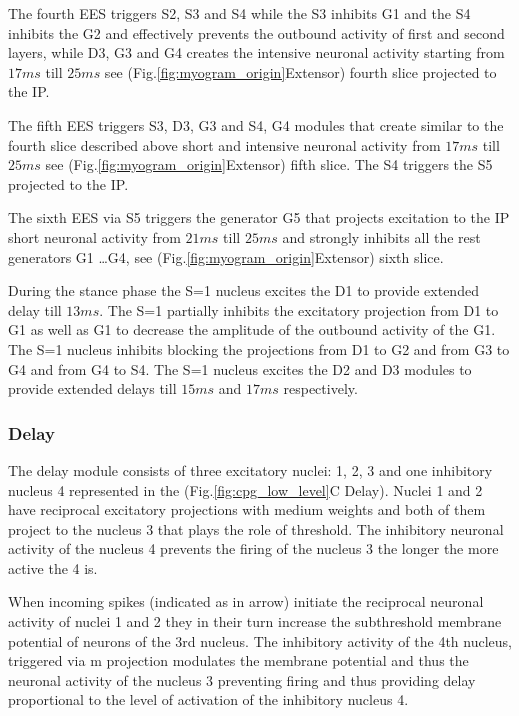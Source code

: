 \documentclass[]{elsarticle}
\begin{document}
The fourth EES triggers S2, S3 and S4 while the S3 inhibits G1 and the S4 inhibits the G2 and effectively prevents the outbound activity of first and second layers, while D3, G3 and G4 creates the intensive neuronal activity starting from $17 ms$ till $25 ms$ see (Fig.\ref{fig:myogram_origin}Extensor) fourth slice projected to the IP.

The fifth EES triggers S3, D3, G3 and S4, G4 modules that create similar to the fourth slice described above short and intensive neuronal activity from $17 ms$ till $25 ms$ see (Fig.\ref{fig:myogram_origin}Extensor) fifth slice. The S4 triggers the S5 projected to the IP.

The sixth EES via S5 triggers the generator G5 that projects excitation to the IP short neuronal activity from $21 ms$ till $25 ms$ and strongly  inhibits all the rest generators G1 \ldots G4, see (Fig.\ref{fig:myogram_origin}Extensor) sixth slice.

During the stance phase the S=1 nucleus excites the D1 to provide extended delay till $13 ms$. The S=1 partially inhibits the excitatory projection from D1 to G1 as well as G1 to decrease the amplitude of the outbound activity of the G1. The S=1 nucleus inhibits blocking the projections from D1 to G2 and from G3 to G4 and from G4 to S4. The S=1 nucleus excites the D2 and D3 modules to provide extended delays till $15 ms$ and $17 ms$ respectively.

\subsubsection{Delay}\label{sec:delay}

The delay module consists of three excitatory nuclei: 1, 2, 3 and one inhibitory nucleus 4 represented in the (Fig.\ref{fig:cpg_low_level}C Delay). Nuclei 1 and 2 have reciprocal excitatory projections with medium weights and both of them project to the nucleus 3 that plays the role of threshold. The inhibitory neuronal activity of the nucleus 4 prevents the firing of the nucleus 3 the longer the more active the 4 is.

When incoming spikes (indicated as in arrow) initiate the reciprocal neuronal activity of nuclei 1 and 2 they in their turn increase the subthreshold membrane potential of neurons of the 3rd nucleus. The inhibitory activity of the 4th nucleus, triggered via m projection modulates the membrane potential and thus the neuronal activity of the nucleus 3 preventing firing and thus providing delay proportional to the level of activation of the inhibitory nucleus 4.
\end{document}

